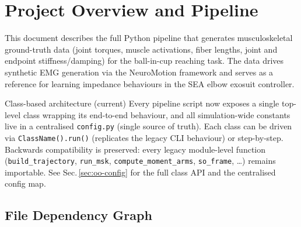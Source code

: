\documentclass[11pt,a4paper]{article}
\newcommand{\file}[1]{\texttt{\color{PipePurple}#1}}
\begin{document}
\tableofcontents
\newpage

\section{Project Overview and Pipeline}

This document describes the full Python pipeline that generates musculoskeletal
ground-truth data (joint torques, muscle activations, fiber lengths, joint and
endpoint stiffness/damping) for the ball-in-cup reaching task. The data drives
synthetic EMG generation via the NeuroMotion framework and serves as a reference
for learning impedance behaviours in the SEA elbow exosuit controller.

\begin{notebox}[PipeGreen]{Class-based architecture (current)}
Every pipeline script now exposes a single top-level class wrapping its
end-to-end behaviour, and all simulation-wide constants live in a centralised
\file{config.py} (single source of truth). Each class can be driven via
\texttt{ClassName().run()} (replicates the legacy CLI behaviour) or
step-by-step. Backwards compatibility is preserved: every legacy module-level
function (\texttt{build\_trajectory}, \texttt{run\_msk}, \texttt{compute\_moment\_arms},
\texttt{so\_frame}, \dots) remains importable. See
Sec.\,\ref{sec:oo-config} for the full class API and the centralised config map.
\end{notebox}

\subsection{File Dependency Graph}
\end{document}
